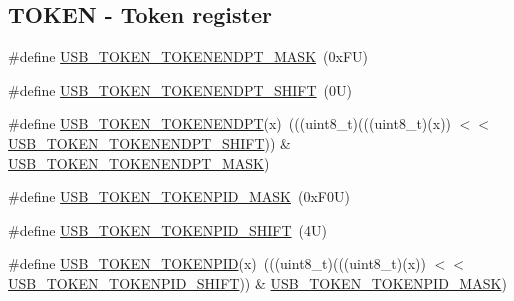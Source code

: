 \subsection*{T\+O\+K\+EN -\/ Token register}
\begin{DoxyCompactItemize}
\item 
\#define \mbox{\hyperlink{group___u_s_b___register___masks_gaa0d3bc1d6ff63ebbccad8b898e39cc84}{U\+S\+B\+\_\+\+T\+O\+K\+E\+N\+\_\+\+T\+O\+K\+E\+N\+E\+N\+D\+P\+T\+\_\+\+M\+A\+SK}}~(0x\+F\+U)
\item 
\#define \mbox{\hyperlink{group___u_s_b___register___masks_ga08c6b329c95f8ac5a39eecfbd347cce2}{U\+S\+B\+\_\+\+T\+O\+K\+E\+N\+\_\+\+T\+O\+K\+E\+N\+E\+N\+D\+P\+T\+\_\+\+S\+H\+I\+FT}}~(0\+U)
\item 
\#define \mbox{\hyperlink{group___u_s_b___register___masks_ga7ac5c83cc884b69828af1c56818e46ab}{U\+S\+B\+\_\+\+T\+O\+K\+E\+N\+\_\+\+T\+O\+K\+E\+N\+E\+N\+D\+PT}}(x)~(((uint8\+\_\+t)(((uint8\+\_\+t)(x)) $<$$<$ \mbox{\hyperlink{group___u_s_b___register___masks_ga08c6b329c95f8ac5a39eecfbd347cce2}{U\+S\+B\+\_\+\+T\+O\+K\+E\+N\+\_\+\+T\+O\+K\+E\+N\+E\+N\+D\+P\+T\+\_\+\+S\+H\+I\+FT}})) \& \mbox{\hyperlink{group___u_s_b___register___masks_gaa0d3bc1d6ff63ebbccad8b898e39cc84}{U\+S\+B\+\_\+\+T\+O\+K\+E\+N\+\_\+\+T\+O\+K\+E\+N\+E\+N\+D\+P\+T\+\_\+\+M\+A\+SK}})
\item 
\#define \mbox{\hyperlink{group___u_s_b___register___masks_ga8880174ec35cfb684d2bcc6e0d5a52bc}{U\+S\+B\+\_\+\+T\+O\+K\+E\+N\+\_\+\+T\+O\+K\+E\+N\+P\+I\+D\+\_\+\+M\+A\+SK}}~(0x\+F0\+U)
\item 
\#define \mbox{\hyperlink{group___u_s_b___register___masks_gae410fcf426d2212be6468703734f6ed9}{U\+S\+B\+\_\+\+T\+O\+K\+E\+N\+\_\+\+T\+O\+K\+E\+N\+P\+I\+D\+\_\+\+S\+H\+I\+FT}}~(4\+U)
\item 
\#define \mbox{\hyperlink{group___u_s_b___register___masks_ga74fd206a0132343b30c41a2184f18ea0}{U\+S\+B\+\_\+\+T\+O\+K\+E\+N\+\_\+\+T\+O\+K\+E\+N\+P\+ID}}(x)~(((uint8\+\_\+t)(((uint8\+\_\+t)(x)) $<$$<$ \mbox{\hyperlink{group___u_s_b___register___masks_gae410fcf426d2212be6468703734f6ed9}{U\+S\+B\+\_\+\+T\+O\+K\+E\+N\+\_\+\+T\+O\+K\+E\+N\+P\+I\+D\+\_\+\+S\+H\+I\+FT}})) \& \mbox{\hyperlink{group___u_s_b___register___masks_ga8880174ec35cfb684d2bcc6e0d5a52bc}{U\+S\+B\+\_\+\+T\+O\+K\+E\+N\+\_\+\+T\+O\+K\+E\+N\+P\+I\+D\+\_\+\+M\+A\+SK}})
\end{DoxyCompactItemize}
